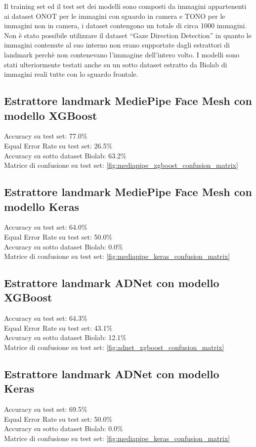 \documentclass[12pt,a4paper,openright,twoside]{book}
\begin{document}
Il training set ed il test set dei modelli sono composti da immagini appartenenti ai dataset ONOT per le immagini con sguardo in camera e TONO per le immagini non in camera, i dataset contengono un totale di circa 1000 immagini. Non è stato possibile utilizzare il dataset ``Gaze Direction Detection'' in quanto le immagini contenute al suo interno non erano supportate dagli estrattori di landmark perchè non contenevano l'immagine dell'intero volto. I modelli sono stati ulteriormente testati anche su un sotto dataset estratto da Biolab di immagini reali tutte con lo sguardo frontale.

\subsection{Estrattore landmark MediePipe Face Mesh con modello XGBoost}
Accuracy su test set: 77.0\% \\
Equal Error Rate su test set: 26.5\% \\
Accuracy su sotto dataset Biolab: 63.2\% \\
Matrice di confusione su test set: \cref{fig:mediapipe_xgboost_confusion_matrix}

\subsection{Estrattore landmark MediePipe Face Mesh con modello Keras}
Accuracy su test set: 64.0\% \\
Equal Error Rate su test set: 50.0\% \\
Accuracy su sotto dataset Biolab: 0.0\% \\
Matrice di confusione su test set: \cref{fig:mediapipe_keras_confusion_matrix}

\subsection{Estrattore landmark ADNet con modello XGBoost}
Accuracy su test set: 64.3\% \\
Equal Error Rate su test set: 43.1\% \\
Accuracy su sotto dataset Biolab: 12.1\% \\
Matrice di confusione su test set: \cref{fig:adnet_xgboost_confusion_matrix}

\subsection{Estrattore landmark ADNet con modello Keras}
Accuracy su test set: 69.5\% \\
Equal Error Rate su test set: 50.0\% \\
Accuracy su sotto dataset Biolab: 0.0\% \\
Matrice di confusione su test set: \cref{fig:mediapipe_keras_confusion_matrix}
\end{document}
